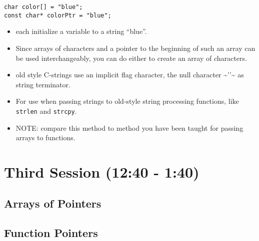 \documentclass[11pt]{article}
\begin{document}
\begin{verbatim}
char color[] = "blue";
const char* colorPtr = "blue";
\end{verbatim}

\begin{itemize}
\item each initialize a variable to a string ``blue''.
\item Since arrays of characters and a pointer to the beginning of such an
  array can be used interchangeably, you can do either to create an
  array of characters.
\item old style C-strings use an implicit flag character, the null character \~{}'\0'\~{} as string terminator.
\item For use when passing strings to old-style string processing functions, like \verb~strlen~ and \verb~strcpy~.
\item NOTE: compare this method to method you have been taught for passing arrays to functions.
\end{itemize}
\section{Third Session (12:40 - 1:40)}
\label{sec-3}
\subsection{Arrays of Pointers}
\label{sec-3-1}
\subsection{Function Pointers}
\label{sec-3-2}
\end{document}
